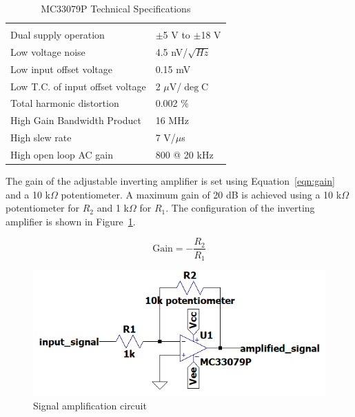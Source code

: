 \documentclass[class=report,11pt,crop=false]{standalone}
\begin{document}
\begin{table}[!htp]
\centering
\caption{\label{tab:mc33079p} MC33079P Technical Specifications}
\vspace{-0.5cm}
\begin{tabular}{|m{14em}|m{3cm}|}
\multicolumn{2}{l}{}\\
\cline{1-2}
Dual supply operation   &   $\pm$5 V to $\pm$18 V\\ \cline{1-2}
Low voltage noise       &   4.5 nV/$\sqrt{Hz}$\\ \cline{1-2}
Low input offset voltage            &   0.15 mV \\ \cline{1-2}
Low T.C. of input offset voltage    &   2 $\mu$V/$\deg$C \\ \cline{1-2}
Total harmonic distortion           &   0.002 \% \\ \cline{1-2}
High Gain Bandwidth Product         &   16 MHz \\ \cline{1-2}
High slew rate          &   7 V/$\mu$s \\ \cline{1-2}
High open loop AC gain  &   800 @ 20 kHz \\ \cline{1-2}
\end{tabular}
\end{table}

The gain of the adjustable inverting amplifier is set using Equation~\ref{eqn:gain} and a 10 k$\Omega$ potentiometer. A maximum gain of 20 dB is achieved using a 10 k$\Omega$ potentiometer for $R_2$ and 1 k$\Omega$ for $R_1$. The configuration of the inverting amplifier is shown in Figure~\ref{fig:amplifier}.

\begin{equation}
    \text{Gain} = - \frac{R_2}{R_1}
    \label{eqn:gain}
\end{equation}

\begin{figure}[htbp]
    \centering
    \includegraphics[width=0.6\columnwidth]{../Images/signal_amplification.png}
    \caption{Signal amplification circuit}
    \label{fig:amplifier}
\end{figure}
\end{document}
